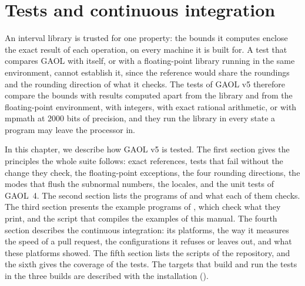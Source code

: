 \chapter{Tests and continuous integration}\label{chap:tests}
%
%

An interval library is trusted for one property: the bounds it computes
enclose the exact result of each operation, on every machine it is built
for. A test that compares GAOL with itself, or with a floating-point library
running in the same environment, cannot establish it, since the reference
would share the roundings and the rounding direction of what it checks. The
tests of GAOL v5 therefore compare the bounds with results computed apart
from the library and from the floating-point environment, with integers,
with exact rational arithmetic, or with mpmath at 2000 bits of precision, and
they run the library in every state a program may leave the processor in.

In this chapter, we describe how GAOL v5 is tested. The first section gives
the principles the whole suite follows: exact references, tests that fail
without the change they check, the floating-point exceptions, the four
rounding directions, the modes that flush the subnormal numbers, the locales,
and the unit tests of GAOL~4. The second section lists the programs of
 and what each of them checks. The third section presents the
example programs of , which check what they print, and the
script that compiles the examples of this manual. The fourth section
describes the continuous integration: its platforms, the way it measures the
speed of a pull request, the configurations it refuses or leaves out, and
what these platforms showed. The fifth section lists the scripts of the
repository, and the sixth gives the coverage of the tests. The targets that
build and run the tests in the three builds are described with the
installation ().

